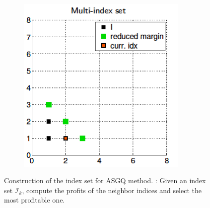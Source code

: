 \documentclass[ima, 20pt, portrait, plainboxedsections]{sciposter}
\begin{document}
\begin{multicols}{3}
\begin{figure}
\begin{subfigure}{0.3\textwidth}
	\caption{}
\end{subfigure}\hfil
\begin{subfigure}{0.3\textwidth}
	\centering
	\includegraphics[width=0.9\textwidth]{./MISC_construction/6}
	\caption{}
\end{subfigure}%
	\caption{Construction of the index set for ASGQ method. : Given an index set $\mathcal{I}_k$, compute the profits of the neighbor indices and select the most profitable one.}
\end{figure}




\end{multicols}
\end{document}
